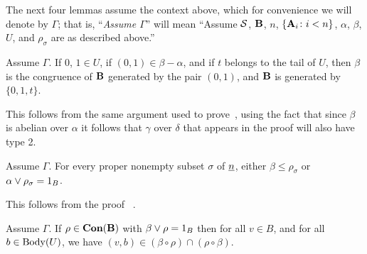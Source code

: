 \documentclass{ws-ijac}
\newcommand{\mysetminus}{\ensuremath{-}}
\begin{document}
The next four lemmas assume the context above, which for convenience
we will denote by $\Gamma$; that is,
``\emph{Assume $\Gamma$}'' will mean ``Assume $\mathcal{S}$, $\mathbf{B}$, $n$, $\{\mathbf{A}_i \colon i < n\}$,
$\alpha$, $\beta$, $U$, and $\rho_\sigma$ are as described above.''


\begin{lemma}
\label{lem:fv_3-1}
Assume $\Gamma$. If\/ $0$, $1 \in U$, if $(0,1) \in \beta \mysetminus \alpha$, and if
$t$ belongs to the tail of $U$, then $\beta$ is the congruence of $\mathbf{B}$
generated by the pair $(0,1)$, and $\mathbf{B}$ is generated by $\{0, 1, t\}$.
\end{lemma}
This follows from the same argument used to prove~\cite[Lemma~3.1]{Freese:2009}, using the fact that since $\beta$ is abelian over $\alpha$ it follows that $\gamma$ over $\delta$ that appears in the proof will also have type 2.




\begin{lemma}
  \label{lem:fv_3-2}
Assume $\Gamma$. For every proper nonempty subset $\sigma$ of $\underline{n}$,
  either $\beta \leq \rho_\sigma$ or $\alpha \join \rho_\sigma = 1_B$.
\end{lemma}
  This follows from the proof ~\cite[Lemma~3.2]{Freese:2009}.


\begin{lemma}\label{lem:nearperm}
Assume $\Gamma$.  If $\rho \in \operatorname{\mathbf{Con}}(\mathbf{B})$ with $\beta \join \rho = 1_B$ then
  for all $v\in B$, and for all $b\in \operatorname{Body}(U)$, we have
  $(v,b) \in (\beta \circ \rho) \cap (\rho \circ \beta)$.
\end{lemma}
\end{document}
